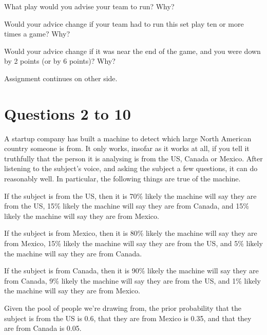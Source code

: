 \documentclass[11pt]{article}
\begin{document}
\begin{enumerate*}
\item What play would you advise your team to run? Why?
\item Would your advice change if your team had to run this set play ten or more times a game? Why?
\item Would your advice change if it was near the end of the game, and you were down by 2 points (or by 6 points)? Why?
\end{enumerate*}

\bigskip
\noindent Assignment continues on other side.

\newpage

\section*{Questions 2 to 10}
A startup company has built a machine to detect which large North American country someone is from. It only works, insofar as it works at all, if you tell it truthfully that the person it is analysing is from the US, Canada or Mexico. After listening to the subject's voice, and asking the subject a few questions, it can do reasonably well. In particular, the following things are true of the machine.

\begin{itemize*}
\item If the subject is from the US, then it is 70\% likely the machine will say they are from the US, 15\% likely the machine will say they are from Canada, and 15\% likely the machine will say they are from Mexico.
\item If the subject is from Mexico, then it is 80\% likely the machine will say they are from Mexico, 15\% likely the machine will say they are from the US, and 5\% likely the machine will say they are from Canada.
\item If the subject is from Canada, then it is 90\% likely the machine will say they are from Canada, 9\% likely the machine will say they are from the US, and 1\% likely the machine will say they are from Mexico.
\end{itemize*}
Given the pool of people we're drawing from, the prior probability that the subject is from the US is 0.6, that they are from Mexico is 0.35, and that they are from Canada is 0.05.
\end{document}
